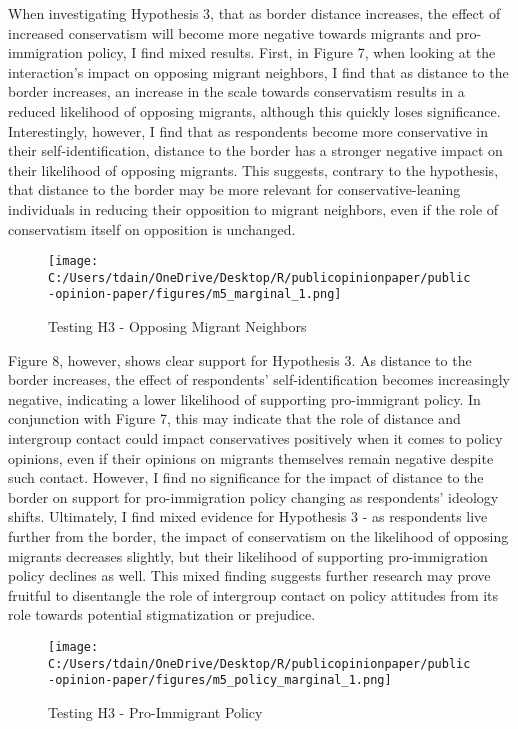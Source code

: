 \documentclass[12pt,]{article}
\begin{document}
When investigating Hypothesis 3, that as border distance increases, the
effect of increased conservatism will become more negative towards
migrants and pro-immigration policy, I find mixed results. First, in
Figure 7, when looking at the interaction's impact on opposing migrant
neighbors, I find that as distance to the border increases, an increase
in the scale towards conservatism results in a reduced likelihood of
opposing migrants, although this quickly loses significance.
Interestingly, however, I find that as respondents become more
conservative in their self-identification, distance to the border has a
stronger negative impact on their likelihood of opposing migrants. This
suggests, contrary to the hypothesis, that distance to the border may be
more relevant for conservative-leaning individuals in reducing their
opposition to migrant neighbors, even if the role of conservatism itself
on opposition is unchanged.

\begin{figure}
\centering
\texttt{[image: C:/Users/tdain/OneDrive/Desktop/R/publicopinionpaper/public-opinion-paper/figures/m5\_marginal\_1.png]}
\caption{Testing H3 - Opposing Migrant Neighbors}
\end{figure}

Figure 8, however, shows clear support for Hypothesis 3. As distance to
the border increases, the effect of respondents' self-identification
becomes increasingly negative, indicating a lower likelihood of
supporting pro-immigrant policy. In conjunction with Figure 7, this may
indicate that the role of distance and intergroup contact could impact
conservatives positively when it comes to policy opinions, even if their
opinions on migrants themselves remain negative despite such contact.
However, I find no significance for the impact of distance to the border
on support for pro-immigration policy changing as respondents' ideology
shifts. Ultimately, I find mixed evidence for Hypothesis 3 - as
respondents live further from the border, the impact of conservatism on
the likelihood of opposing migrants decreases slightly, but their
likelihood of supporting pro-immigration policy declines as well. This
mixed finding suggests further research may prove fruitful to
disentangle the role of intergroup contact on policy attitudes from its
role towards potential stigmatization or prejudice.

\begin{figure}
\centering
\texttt{[image: C:/Users/tdain/OneDrive/Desktop/R/publicopinionpaper/public-opinion-paper/figures/m5\_policy\_marginal\_1.png]}
\caption{Testing H3 - Pro-Immigrant Policy}
\end{figure}
\end{document}

